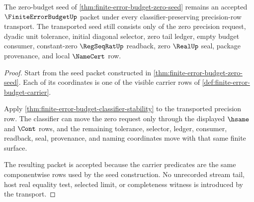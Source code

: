 \begin{theorem}
\label{thm:finite-error-budget-zero-budget-stability}
The zero-budget seed of \autoref{thm:finite-error-budget-zero-seed} remains an
accepted $\FiniteErrorBudgetUp$ packet under every classifier-preserving
precision-row transport. The transported seed still consists only of the zero
precision request, dyadic unit tolerance, initial diagonal selector, zero tail
ledger, empty budget consumer, constant-zero $\RegSeqRatUp$ readback,
zero $\RealUp$ seal, package provenance, and local $\NameCert$ row.
\end{theorem}
\begin{proof}
Start from the seed packet constructed in
\autoref{thm:finite-error-budget-zero-seed}. Each of its coordinates is one of
the visible carrier rows of \autoref{def:finite-error-budget-carrier}.

Apply \autoref{thm:finite-error-budget-classifier-stability} to the transported
precision row. The classifier can move the zero request only through the
displayed $\hsame$ and $\Cont$ rows, and the remaining tolerance, selector,
ledger, consumer, readback, seal, provenance, and naming coordinates move with
that same finite surface.

The resulting packet is accepted because the carrier predicates are the same
componentwise rows used by the seed construction. No unrecorded stream tail,
host real equality test, selected limit, or completeness witness is introduced
by the transport.
\end{proof}

